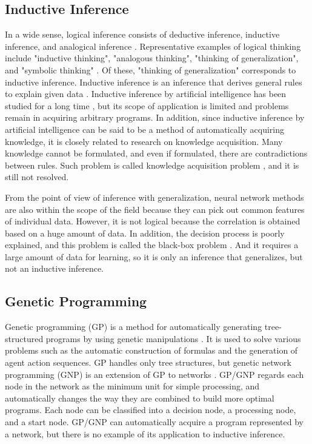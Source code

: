 \documentclass{article}
\begin{document}
\subsection {Inductive Inference}
In a wide sense, logical inference consists of deductive inference, inductive inference, and analogical inference \cite{math300}.
Representative examples of logical thinking include "inductive thinking", "analogous thinking", "thinking of generalization", and "symbolic thinking" \cite{saito:11}.
Of these, "thinking of generalization" corresponds to inductive inference.
Inductive inference is an inference that derives general rules to explain given data \cite {inductive-reasoning}.
Inductive inference by artificial intelligence has been studied for a long time \cite{CASE1983193}\cite{4767034}, but its scope of application is limited and problems remain in acquiring arbitrary programs.
In addition, since inductive inference by artificial intelligence can be said to be a method of automatically acquiring knowledge, it is closely related to research on knowledge acquisition.
Many knowledge cannot be formulated, and even if formulated, there are contradictions between rules. 
Such problem is called knowledge acquisition problem \cite{KnowledgeAI}\cite{KAIssues}, and it is still not resolved.

From the point of view of inference with generalization, neural network methods are also within the scope of the field because they can pick out common features of individual data.
However, it is not logical because the correlation is obtained based on a huge amount of data.
In addition, the decision process is poorly explained, and this problem is called the black-box problem \cite{BlackBoxProblem}.
And it requires a large amount of data for learning, so it is only an inference that generalizes, but not an inductive inference.

\subsection {Genetic Programming}
Genetic programming (GP) is a method for automatically generating tree-structured programs by using genetic manipulations \cite{Koza1994}.
It is used to solve various problems such as the automatic construction of formulas and the generation of agent action sequences.
GP handles only tree structures, but genetic network programming (GNP) is an extension of GP to networks \cite{gnp}.
GP/GNP regards each node in the network as the minimum unit for simple processing, and automatically changes the way they are combined to build more optimal programs.
Each node can be classified into a decision node, a processing node, and a start node.
GP/GNP can automatically acquire a program represented by a network, but there is no example of its application to inductive inference.
\end{document}
